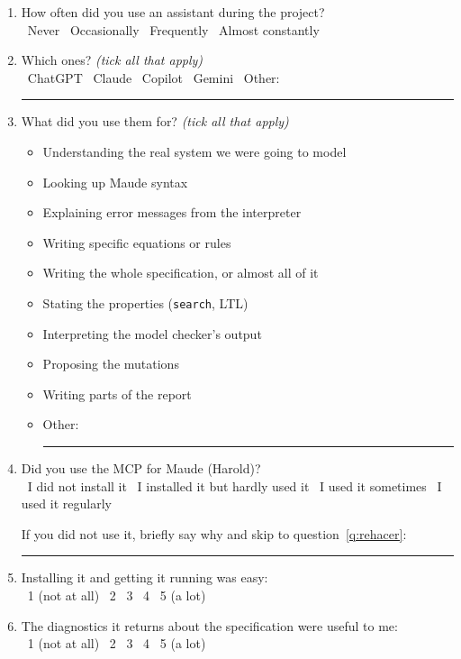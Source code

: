 \begin{enumerate}[leftmargin=*,resume]

\item How often did you use an assistant during the project?\\
\cb\ Never \quad
\cb\ Occasionally \quad
\cb\ Frequently \quad
\cb\ Almost constantly

\item Which ones? \emph{(tick all that apply)}\\
\cb\ ChatGPT \quad \cb\ Claude \quad \cb\ Copilot \quad \cb\ Gemini \quad
\cb\ Other: \rule{4cm}{0.4pt}

\item What did you use them for? \emph{(tick all that apply)}

\begin{itemize}[leftmargin=*,label=\cb,itemsep=1pt]
\item Understanding the real system we were going to model
\item Looking up Maude syntax
\item Explaining error messages from the interpreter
\item Writing specific equations or rules
\item Writing the whole specification, or almost all of it
\item Stating the properties (\texttt{search}, LTL)
\item Interpreting the model checker's output
\item Proposing the mutations
\item Writing parts of the report
\item Other: \rule{5cm}{0.4pt}
\end{itemize}

\item Did you use the MCP for Maude (Harold)?\\
\cb\ I did not install it \quad
\cb\ I installed it but hardly used it \quad
\cb\ I used it sometimes \quad
\cb\ I used it regularly

\smallskip
{\small If you did not use it, briefly say why and skip to
question~\ref{q:rehacer}: \rule{5.5cm}{0.4pt}}

\item Installing it and getting it running was easy:\\
\cb\ 1 (not at all) \quad \cb\ 2 \quad \cb\ 3 \quad \cb\ 4 \quad \cb\ 5 (a lot)

\item The diagnostics it returns about the specification were useful to me:\\
\cb\ 1 (not at all) \quad \cb\ 2 \quad \cb\ 3 \quad \cb\ 4 \quad \cb\ 5 (a lot)


\end{enumerate}
